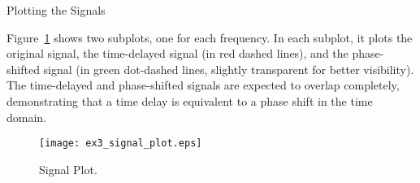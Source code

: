 
\item [b)]
Plotting the Signals

Figure~\ref{fig:SignalPlot} shows two subplots, one for each frequency. In each subplot, it plots the original signal,
the time-delayed signal (in red dashed lines), and the phase-shifted signal (in green dot-dashed lines,
slightly transparent for better visibility).
The time-delayed and phase-shifted signals are expected to overlap completely,
demonstrating that a time delay is equivalent to a phase shift in the time domain.
\begin{figure}[!ht]
	\centering
	\texttt{[image: ex3\_signal\_plot.eps]}
	\vspace{-0.3cm}
	\caption{Signal Plot.}
	\label{fig:SignalPlot}
	\vspace{-0.1cm}
\end{figure}


